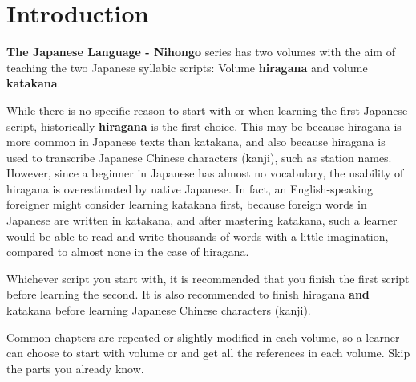 \chapter*{Introduction}
\label{chap:Introduction}

\textbf{The Japanese Language - Nihongo} series has two volumes with the aim of
teaching the two Japanese syllabic scripts: Volume 
\textbf{hiragana} and volume  \textbf{katakana}.%
%
%

While there is no specific reason to start with \jtopic or \jtopicopposite when
learning the first Japanese script, historically \textbf{hiragana} is the first
choice. This may be because hiragana is more common in Japanese texts than
katakana, and also because hiragana is used to transcribe Japanese Chinese
characters (kanji), such as station names. However, since a beginner in
Japanese has almost no vocabulary, the usability of hiragana is overestimated
by native Japanese. In fact, an English-speaking foreigner might consider
learning katakana first, because foreign words in Japanese are written in
katakana, and after mastering katakana, such a learner would be able to read
and write thousands of words with a little imagination, compared to almost none
in the case of hiragana.  

Whichever script you start with, it is recommended that you finish the first
script before learning the second. It is also recommended to finish hiragana
\textbf{and} katakana before learning Japanese Chinese characters (kanji).

Common chapters are repeated or slightly modified in each volume, so a learner
can choose to start with volume {} or {} and get all
the references in each volume. Skip the parts you already know.




